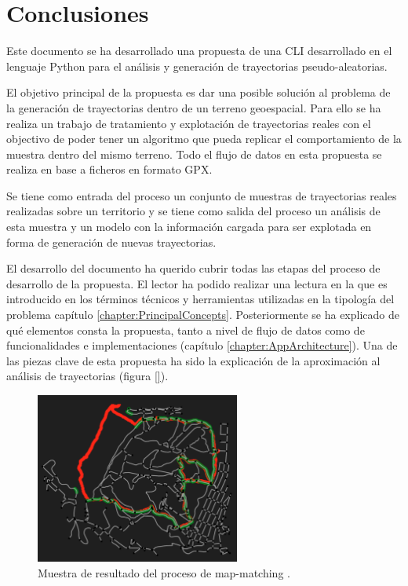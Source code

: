 
\chapter{Conclusiones} \label{chapter:Conclusion}
Este documento se ha desarrollado una propuesta de una \ac{CLI} desarrollado en el lenguaje Python para el análisis y  generación de trayectorias pseudo-aleatorias.

El objetivo principal de la propuesta es dar una posible solución al problema de la generación de trayectorias dentro de un terreno geoespacial. Para ello se ha realiza un trabajo de tratamiento y explotación de trayectorias reales con el objectivo de poder tener un algoritmo que pueda replicar el comportamiento de la muestra dentro del mismo terreno. Todo el flujo de datos en esta propuesta se realiza en base a ficheros en formato \ac{GPX}.

Se tiene como entrada del proceso un conjunto de muestras de trayectorias reales realizadas sobre un territorio y se tiene como salida del proceso un análisis de esta muestra y un modelo con la información cargada para ser explotada en forma de generación de nuevas trayectorias.

El desarrollo del documento ha querido cubrir todas las etapas del proceso de desarrollo de la propuesta. El lector ha podido realizar una lectura en la que es introducido en los términos técnicos y herramientas utilizadas en la tipología del problema capítulo \ref{chapter:PrincipalConcepts}. Posteriormente se ha explicado de qué elementos consta la propuesta, tanto a nivel de flujo de datos como de funcionalidades e implementaciones (capítulo \ref{chapter:AppArchitecture}). Una de las piezas clave de esta propuesta ha sido la explicación de la aproximación al análisis de trayectorias (figura \ref{}).

\begin{figure}[!htb]
\begin{center}
\includegraphics[width=0.6\textwidth]{./Imagenes/MapMatching1.png}
\caption{Muestra de resultado del proceso de map-matching .}
\label{figure:PointGeneration01}
\end{center}
\end{figure}
\newpage

